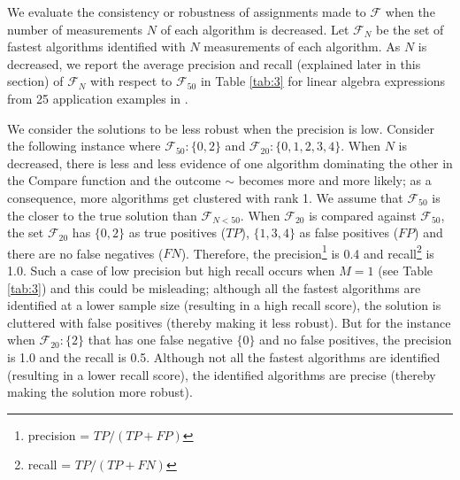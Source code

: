 \documentclass[conference]{IEEEtran}
\begin{document}
We evaluate the consistency or robustness of assignments made to $\mathcal{F}$ when the number of measurements $N$ of each algorithm is decreased. Let $\mathcal{F}_{N}$ be the set of fastest algorithms identified with $N$ measurements of each algorithm. As $N$ is decreased, we report the average precision and recall (explained later in this section) of $\mathcal{F}_N $ with respect to $\mathcal{F}_{50}$ in Table \ref{tab:3} for linear algebra expressions from 25 application examples in \cite{barthels2019linnea}.

We consider the solutions to be less robust when the precision is low. Consider the following instance where $\mathcal{F}_{50} : \{0,2\}$ and $\mathcal{F}_{20} : \{0,1,2,3,4\}$. When $N$ is decreased, there is less and less evidence of one algorithm dominating the other in the Compare function and the outcome $\sim$ becomes more and more likely; as a consequence, more algorithms get clustered with rank 1. We assume that $\mathcal{F}_{50}$ is the closer to the true solution than $\mathcal{F}_{N<50}$. When $\mathcal{F}_{20}$ is compared against $\mathcal{F}_{50}$, the set $\mathcal{F}_{20}$ has  $\{0,2\}$ as true positives ($TP$), $\{1,3,4\}$  as false positives ($FP$) and there are no false negatives ($FN$). Therefore, the precision\footnote{precision = $TP/(TP+FP)$} is 0.4 and recall\footnote{recall = $TP/(TP+FN)$} is 1.0. Such a case of low precision but high recall occurs when $M=1$ (see Table \ref{tab:3}) and this could be misleading; although all the fastest algorithms are identified at a lower sample size (resulting in a high recall score), the solution is cluttered with false positives (thereby making it less robust). But for the instance when $\mathcal{F}_{20} : \{2\}$ that has one false negative $\{0\}$ and no false positives, the precision is 1.0 and the recall is 0.5. Although not all the fastest algorithms are identified (resulting in a lower recall score), the identified algorithms are precise (thereby making the solution more robust).
\end{document}
